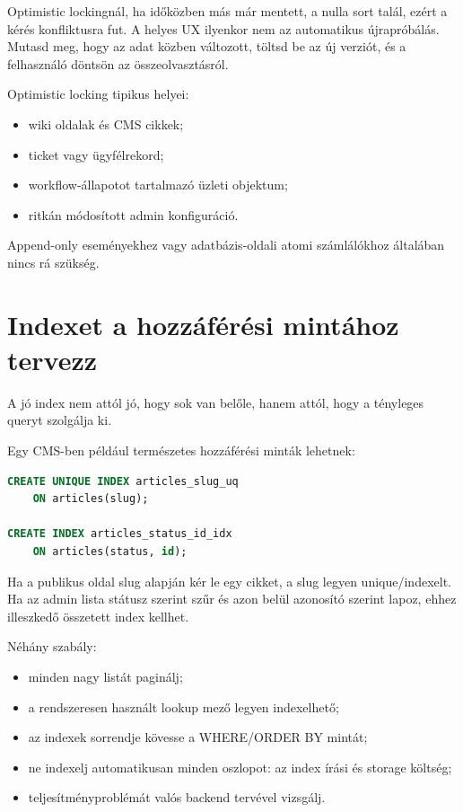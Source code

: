 Optimistic lockingnál, ha időközben más már mentett, a  nulla sort talál, ezért a kérés konfliktusra fut. A helyes UX ilyenkor nem az automatikus újrapróbálás. Mutasd meg, hogy az adat közben változott, töltsd be az új verziót, és a felhasználó döntsön az összeolvasztásról.

Optimistic locking tipikus helyei:

\begin{itemize}
\item wiki oldalak és CMS cikkek;
\item ticket vagy ügyfélrekord;
\item workflow-állapotot tartalmazó üzleti objektum;
\item ritkán módosított admin konfiguráció.
\end{itemize}

Append-only eseményekhez vagy adatbázis-oldali atomi számlálókhoz általában nincs rá szükség.

\section{Indexet a hozzáférési mintához tervezz}

A jó index nem attól jó, hogy sok van belőle, hanem attól, hogy a tényleges queryt szolgálja ki.

Egy CMS-ben például természetes hozzáférési minták lehetnek:

\begin{lstlisting}[language=SQL]
CREATE UNIQUE INDEX articles_slug_uq
    ON articles(slug);

CREATE INDEX articles_status_id_idx
    ON articles(status, id);
\end{lstlisting}

Ha a publikus oldal slug alapján kér le egy cikket, a slug legyen unique/indexelt. Ha az admin lista státusz szerint szűr és azon belül azonosító szerint lapoz, ehhez illeszkedő összetett index kellhet.

Néhány szabály:

\begin{itemize}
\item minden nagy listát paginálj;
\item a rendszeresen használt lookup mező legyen indexelhető;
\item az indexek sorrendje kövesse a WHERE/ORDER BY mintát;
\item ne indexelj automatikusan minden oszlopot: az index írási és storage költség;
\item teljesítményproblémát valós backend  tervével vizsgálj.
\end{itemize}

